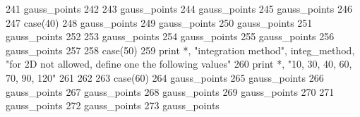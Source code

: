 \begin{DoxyCode}
{{241 \textcolor{comment}{              gauss_points%
242 \textcolor{comment}{}
243 \textcolor{comment}{              gauss_points%
244 \textcolor{comment}{              gauss_points%
245 \textcolor{comment}{              gauss_points%
246 \textcolor{comment}{}
247 \textcolor{comment}{            }\textcolor{keywordflow}{case}(40) 
248               gauss_points%
249               gauss_points%
250               gauss_points%
251               gauss_points%
252 \textcolor{comment}{}
253 \textcolor{comment}{              gauss_points%
254 \textcolor{comment}{              gauss_points%
255 \textcolor{comment}{              gauss_points%
256 \textcolor{comment}{              gauss_points%
257 \textcolor{comment}{}
258 \textcolor{comment}{            }\textcolor{keywordflow}{case}(50)
259               print *, \textcolor{stringliteral}{"integration method"}, integ_method,   \textcolor{stringliteral}{"for 2D not allowed, define one the following
       values"}
260               print *, \textcolor{stringliteral}{"10, 30, 40, 60, 70, 90, 120"}
261 
262 
263             \textcolor{keywordflow}{case}(60)
264               gauss_points%
265 \textcolor{comment}{              gauss_points%
266 \textcolor{comment}{              gauss_points%
267 \textcolor{comment}{              gauss_points%
268 \textcolor{comment}{              gauss_points%
269 \textcolor{comment}{              gauss_points%
270 \textcolor{comment}{}
271 \textcolor{comment}{              gauss_points%
272 \textcolor{comment}{              gauss_points%
273 \textcolor{comment}{              gauss_points%
}}}}}}}}}}}}}}}}}}
\end{DoxyCode}
